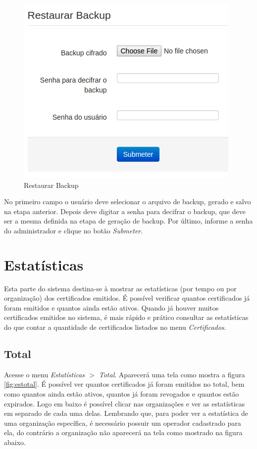 \begin{figure}[ht]
     \centering
     \includegraphics[scale=0.6]{images/restaurarbackup.png}
     \caption{Restaurar Backup}
     \label{fig:restaurarbackup}
\end{figure}

No primeiro campo o usuário deve selecionar o arquivo de backup, gerado e salvo na etapa anterior. Depois deve digitar a senha para decifrar o backup, que deve ser a mesma definida na etapa de geração de backup. Por último, informe a senha do administrador e clique no botão \textit{Submeter}.

\section{Estatísticas}

Esta parte do sistema destina-se à mostrar as estatísticas (por tempo ou por organização) dos certificados emitidos. É possível verificar quantos certificados já foram emitidos e quantos ainda estão ativos. Quando já houver muitos certificados emitidos no sistema, é mais rápido e prático consultar as estatísticas do que contar a quantidade de certificados listados no menu \textit{Certificados}.

\subsection{Total}

Acesse o menu \textit{Estatísticas $>$ Total}. Aparecerá uma tela como mostra a figura \ref{fig:estotal}. É possível ver quantos certificados já foram emitidos no total, bem como quantos ainda estão ativos, quantos já foram revogados e quantos estão expirados. Logo em baixo é possível clicar nas organizações e ver as estatísticas em separado de cada uma delas. Lembrando que, para poder ver a estatística de uma organização específica, é necessário possuir um operador cadastrado para ela, do contrário a organização não aparecerá na tela como mostrado na figura abaixo.

